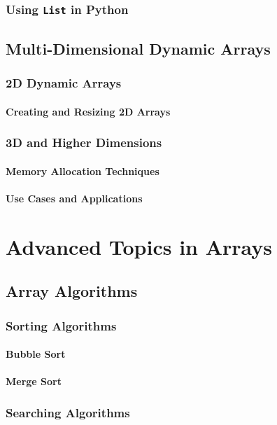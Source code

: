\documentclass[12pt, oneside]{book}
\begin{document}
	\subsection{Using \texttt{List} in Python}
	
	\section{Multi-Dimensional Dynamic Arrays}
	\subsection{2D Dynamic Arrays}
	\subsubsection{Creating and Resizing 2D Arrays}
	\subsection{3D and Higher Dimensions}
	\subsubsection{Memory Allocation Techniques}
	\subsubsection{Use Cases and Applications}
	
\chapter{Advanced Topics in Arrays}

	\section{Array Algorithms}
	\subsection{Sorting Algorithms}
	\subsubsection{Bubble Sort}
	\subsubsection{Merge Sort}
	\subsection{Searching Algorithms}
\end{document}
